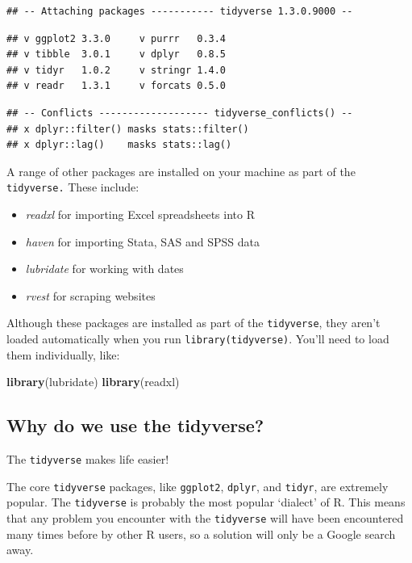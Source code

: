 \documentclass[
]{book}
\newenvironment{Shaded}{\begin{snugshade}}{\end{snugshade}}
\newcommand{\KeywordTok}[1]{\textcolor[rgb]{0.13,0.29,0.53}{\textbf{#1}}}
\newcommand{\NormalTok}[1]{#1}
\providecommand{\tightlist}{%
  \setlength{\itemsep}{0pt}\setlength{\parskip}{0pt}}
\begin{document}
\begin{verbatim}
## -- Attaching packages ----------- tidyverse 1.3.0.9000 --
\end{verbatim}

\begin{verbatim}
## v ggplot2 3.3.0     v purrr   0.3.4
## v tibble  3.0.1     v dplyr   0.8.5
## v tidyr   1.0.2     v stringr 1.4.0
## v readr   1.3.1     v forcats 0.5.0
\end{verbatim}

\begin{verbatim}
## -- Conflicts ------------------- tidyverse_conflicts() --
## x dplyr::filter() masks stats::filter()
## x dplyr::lag()    masks stats::lag()
\end{verbatim}

A range of other packages are installed on your machine as part of the \texttt{tidyverse.} These include:

\begin{itemize}
\tightlist
\item
  \emph{readxl} for importing Excel spreadsheets into R
\item
  \emph{haven} for importing Stata, SAS and SPSS data
\item
  \emph{lubridate} for working with dates
\item
  \emph{rvest} for scraping websites
\end{itemize}

Although these packages are installed as part of the \texttt{tidyverse}, they aren't loaded automatically when you run \texttt{library(tidyverse)}. You'll need to load them individually, like:

\begin{Shaded}
\begin{Highlighting}[]
\KeywordTok{library}\NormalTok{(lubridate)}
\KeywordTok{library}\NormalTok{(readxl)}
\end{Highlighting}
\end{Shaded}

\hypertarget{why-do-we-use-the-tidyverse}{%
\subsection{Why do we use the tidyverse?}\label{why-do-we-use-the-tidyverse}}

The \texttt{tidyverse} makes life easier!

The core \texttt{tidyverse} packages, like \texttt{ggplot2}, \texttt{dplyr}, and \texttt{tidyr}, are extremely popular. The \texttt{tidyverse} is probably the most popular `dialect' of R. This means that any problem you encounter with the \texttt{tidyverse} will have been encountered many times before by other R users, so a solution will only be a Google search away.
\end{document}
